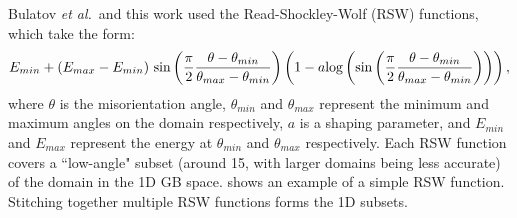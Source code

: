 \documentclass[12pt]{report}
\begin{document}
Bulatov \emph{et al.}\ and this work used the Read-Shockley-Wolf (RSW) functions,\cite{wolf1989} which take the form:
\begin{equation}
E_{min} + (E_{max} - E_{min})\ \textnormal{sin}\left(\frac{\pi}{2}\frac{\theta-\theta_{min}}{\theta_{max} - \theta_{min}}\right)\left(1-a\textnormal{log}\left(\textnormal{sin}\left(\frac{\pi}{2}\frac{\theta-\theta_{min}}{\theta_{max} - \theta_{min}}\right)\right)\right),
\end{equation}
where $\theta$ is the misorientation angle, $\theta_{min}$ and $\theta_{max}$ represent the minimum and maximum angles on the domain respectively, $a$ is a shaping parameter, and $E_{min}$ and $E_{max}$ represent the energy at $\theta_{min}$ and $\theta_{max}$ respectively.  Each RSW function covers a ``low-angle" subset (around 15\textdegree{}, with larger domains being less accurate)\cite{rohrer2011,wolf1989} of the domain in the 1D GB space.   shows an example of a simple RSW function.  Stitching together multiple RSW functions forms the 1D subsets.
\end{document}
